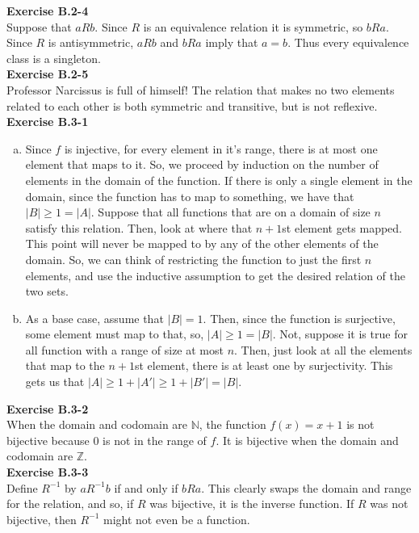 \documentclass{article}
\begin{document}
\noindent\textbf{Exercise B.2-4}\\

Suppose that $a R b$.  Since $R$ is an equivalence relation it is symmetric, so $bRa$.  Since $R$ is antisymmetric, $aRb$ and $bRa$ imply that $a = b$.  Thus every equivalence class is a singleton. \\

\noindent\textbf{Exercise B.2-5}\\
Professor Narcissus is full of himself! The relation that makes no two elements related to each other is both symmetric and transitive, but is not reflexive.\\

\noindent\textbf{Exercise B.3-1}\\
\begin{enumerate}[a.]
\item
Since $f$ is injective, for every element in it's range, there is at most one element that maps to it. So, we proceed by induction on the number of elements in the domain of the function. If there is only a single element in the domain, since the function has to map to something, we have that $|B|\ge 1 = |A|$. Suppose that all functions that are on a domain of size $n$ satisfy this relation. Then, look at where that $n+1$st element gets mapped. This point will never be mapped to by any of the other elements of the domain. So, we can think of restricting the function to just the first $n$ elements, and use the inductive assumption to get the desired relation of the two sets.
\item
As a base case, assume that $|B|=1$. Then, since the function is surjective, some element must map to that, so, $|A|\ge 1 = |B|$. Not, suppose it is true for all function with a range of size at most $n$. Then, just look at all the elements that map to the $n+1$st element, there is at least one by surjectivity. This gets us that $|A| \ge 1 + |A'| \ge 1 + |B'| = |B|$.
\end{enumerate}

\noindent\textbf{Exercise B.3-2}\\

When the domain and codomain are $\mathbb{N}$, the function $f(x) = x+1$ is not bijective because 0 is not in the range of $f$.  It is bijective when the domain and codomain are $\mathbb{Z}$. \\


\noindent\textbf{Exercise B.3-3}\\
Define $R^{-1}$ by $a R^{-1} b$ if and only if $b R a$. This clearly swaps the domain and range for the relation, and so, if $R$ was bijective, it is the inverse function. If $R$ was not bijective, then $R^{-1}$ might not even be a function.\\
\end{document}

